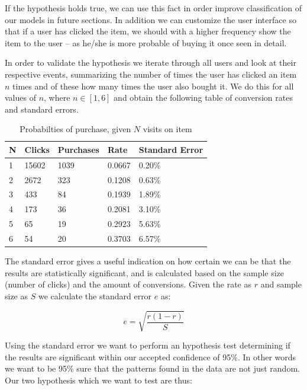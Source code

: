If the hypothesis holds true, we can use this fact in order improve
classification of our models in future sections. In addition we can customize
the user interface so that if a user has clicked the item, we should with a
higher frequency show the item to the user -- as he/she is more probable of
buying it once seen in detail.

In order to validate the hypothesis we iterate through all users and look at
their respective events, summarizing the number of times the user has clicked
an item $n$ times and of these how many times the user also bought it. We do
this for all values of $n$, where $n \in [1,6]$ and obtain the following table
of conversion rates and standard errors.

\begin{table}[H]
  \centering
  \begin{tabular}{lllll}
    \toprule
    N & Clicks & Purchases & Rate & Standard Error \\
    \midrule
    1 & 15602 & 1039  & 0.0667 & 0.20\% \\
    2 & 2672  & 323   & 0.1208 & 0.63\% \\
    3 & 433   & 84    & 0.1939 & 1.89\% \\
    4 & 173   & 36    & 0.2081 & 3.10\% \\
    5 & 65    & 19    & 0.2923 & 5.63\% \\
    6 & 54    & 20    & 0.3703 & 6.57\% \\
    \bottomrule
  \end{tabular}
  \label{tab:prob-purchase}
  \caption{Probabilties of purchase, given $N$ visits on item}
\end{table}

The standard error gives a useful indication on how certain we can be that the
results are statistically significant, and is calculated based on the sample
size (number of clicks) and the amount of conversions. Given the rate as $r$
and sample size as $S$ we calculate the standard error $e$ as:

\begin{equation}
  e = \sqrt{\frac{r(1 - r)}{S}}
\end{equation}

Using the standard error we want to perform an hypothesis test determining if
the results are significant within our accepted confidence of 95\%. In other
words we want to be 95\% sure that the patterns found in the data are not just
random. Our two hypothesis which we want to test are thus:

